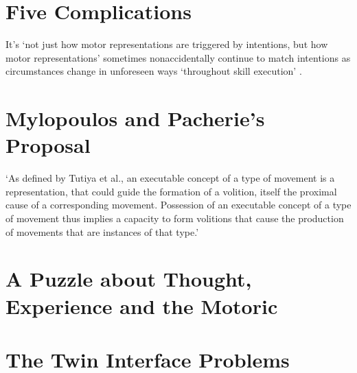 \documentclass[12pt]{extarticle}
\begin{document}
\begin{multicols*}{3}
 
 
\section{Five Complications}
 
It’s ‘not just how motor representations are triggered by intentions, but how motor
representations’ sometimes nonaccidentally continue to match intentions as circumstances change in unforeseen ways ‘throughout
skill execution’
\citep[p.~19]{fridland:2016_skill}.
 
 
 
\section{Mylopoulos and Pacherie’s Proposal}
 
‘As defined by Tutiya et al., an executable concept of a type of movement is a
representation, that could guide the formation of a volition, itself the proximal cause of
a corresponding movement. Possession of an executable concept of a type of movement thus
implies a capacity to form volitions that cause the production of movements that are
instances of that type.’
\citep[p.~7]{pacherie:2011_nonconceptual}
 
 
 
\section{A Puzzle about Thought, Experience and the Motoric}
 
 
 
\section{The Twin Interface Problems}
 
 
 


\footnotesize


\end{multicols*}
\end{document}
